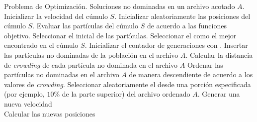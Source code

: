 \begin{itemize}
\begin{algorithm}
      \begin{algorithmic}[1]			
	    \REQUIRE Problema de Optimizaci\'on.
	\ENSURE Soluciones no dominadas en un archivo acotado $A$.	  	  
	  \STATE Inicializar la velocidad \DIFdelbegin {}\DIFdelend \DIFaddbegin {}\DIFaddend del c\'umulo $S$.
	  \STATE Inicializar aleatoriamente las posiciones del c\'umulo $S$.
	  \STATE Evaluar las part\'iculas del c\'umulo $S$ de acuerdo a las funciones objetivo.
	  \STATE Seleccionar el \DIFdelbegin {}\DIFdelend \DIFaddbegin {}\DIFaddend inicial de las part\'iculas.
	  \STATE Seleccionar el \DIFdelbegin {}\DIFdelend \DIFaddbegin {}\DIFaddend como el mejor encontrado en el c\'umulo $S$.
	  \STATE Inicializar el contador de generaciones con \DIFdelbegin {}\DIFdelend \DIFaddbegin {}\DIFaddend .
	  \STATE Insertar las part\'iculas no dominadas de la poblaci\'on en el archivo $A$.	  
	  \STATE Calcular la distancia de \textit{crowding} de cada part\'icula no dominada en el archivo $A$
	  \STATE Ordenar las part\'iculas no dominadas en el archivo $A$ de manera descendiente de acuerdo a los valores 
	     de \textit{crowding}.	   
	      \STATE Seleccionar aleatoriamente el \DIFdelbegin {}\DIFdelend \DIFaddbegin {}\DIFaddend desde una porci\'on especificada (por ejemplo, $10\%$ de la parte superior) 
	      del archivo ordenado $A$.
	     \STATE Generar una nueva velocidad 
		\\  \DIFdelbegin {}\DIFdelend \DIFaddbegin {}\DIFaddend \STATE Calcular las nuevas posiciones 
		\\\DIFdelbegin {}\DIFdelend \DIFaddbegin {}
\end{algorithmic}
\end{algorithm}
\end{itemize}
